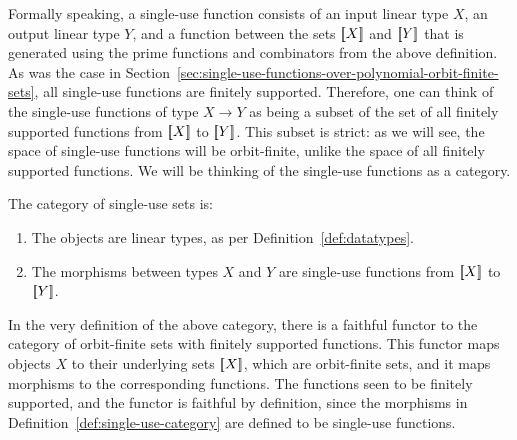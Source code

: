 \documentclass[a4paper,UKenglish,cleveref, autoref, numberwithinsect, thm-restate]{lipics-v2021}
\begin{document}
   


Formally speaking, a single-use function consists of an input linear type $X$, an output linear type $Y$, and a function between the sets $[{\kern-0.45ex}[X]{\kern-0.45ex}]$ and $[{\kern-0.45ex}[Y]{\kern-0.45ex}]$ that is generated using the prime functions and combinators from the above definition.  As was the case in Section~\ref{sec:single-use-functions-over-polynomial-orbit-finite-sets}, all single-use functions are  finitely supported.  Therefore, one can think of the single-use functions of type $X \to Y$ as being a subset of the set of all finitely supported functions from $[{\kern-0.45ex}[X]{\kern-0.45ex}]$ to $[{\kern-0.45ex}[Y]{\kern-0.45ex}]$. This subset is strict: as we will see, the space of single-use functions will be orbit-finite, unlike the space of all finitely supported functions. We will be thinking of the single-use functions as a category.




\begin{definition}\label{def:single-use-category}
    The category of single-use sets is:
    \begin{enumerate}
        \item The objects are linear types, as per Definition~\ref{def:datatypes}.
        \item The morphisms between types $X$ and $Y$ are single-use functions from $[{\kern-0.45ex}[X]{\kern-0.45ex}]$ to $[{\kern-0.45ex}[Y]{\kern-0.45ex}]$.
    \end{enumerate}
\end{definition}

In the very definition of the above category, there is a faithful functor to the category of  orbit-finite sets with finitely supported functions. This functor maps objects $X$ to their underlying sets $[{\kern-0.45ex}[X]{\kern-0.45ex}]$, which are orbit-finite sets, and it maps morphisms to the corresponding functions. The functions seen to be finitely supported, and the functor is faithful  by definition, since the morphisms in Definition~\ref{def:single-use-category} are defined to be single-use functions. 



\end{document}
